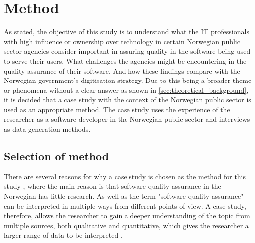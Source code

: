 \chapter{Method} \label{sec:method}


As stated, the objective of this study is to understand what the IT professionals with high influence or ownership over technology in certain Norwegian public sector agencies consider important in assuring quality in the software being used to serve their users. What challenges the agencies might be encountering in the quality assurance of their software. And how these findings compare with the Norwegian government's digitisation strategy. Due to this being a broader theme or phenomena \cite{bjo_2022} without a clear answer as shown in \autoref{sec:theoretical_background}, it is decided that a case study with the context of the Norwegian public sector is used as an appropriate method. The case study uses the experience of the researcher as a software developer in the Norwegian public sector and interviews as data generation methods.

\section{Selection of method}
There are several reasons for why a case study is chosen as the method for this study \cite{bjo_2022}, where the main reason is that software quality assurance in the Norwegian has little research. As well as the term "software quality assurance" can be interpreted in multiple ways from different points of view. A case study, therefore, allows the researcher to gain a deeper understanding of the topic from multiple sources, both qualitative and quantitative, which gives the researcher a larger range of data to be interpreted \cite{bjo_2022}.

